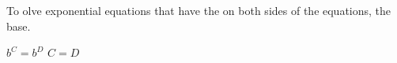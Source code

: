 \begin{minipage}{0.55\textwidth}
    To olve exponential equations that have the
      on both sides of the equations,
     the base.
\end{minipage}
\begin{minipage}{0.44\textwidth}
    \begin{tcolorbox}[center,colback=white,width=2.75in,]
        \centering\large
        $b^C = b^D$ \quad {\Large $\Longleftrightarrow$} \quad $C = D$
    \end{tcolorbox}
\end{minipage}

